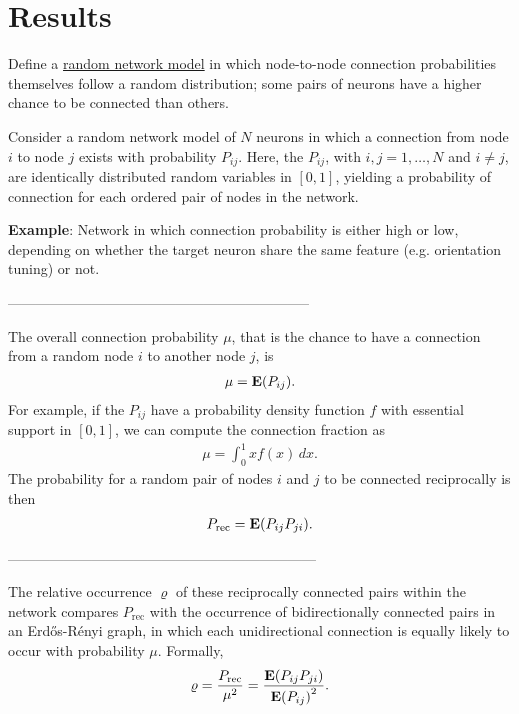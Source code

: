 
\section*{Results}

Define a \underline{random network model} in which node-to-node connection probabilities themselves follow a random distribution; some pairs of neurons have a higher chance to be connected than others.


Consider a random network model of $N$ neurons in which a connection from node $i$ to node $j$ exists with probability $P_{ij}$.
%
Here, the $P_{ij}$, with $i,j = 1,\dots,N$ and $i \neq j$, are identically distributed random variables in $[0,1]$, yielding a probability of connection for each ordered pair of nodes in the network.

\textbf{\textcolor{gblue}{Example}}: Network in which connection probability is either high or low, depending on whether the target neuron share the same feature (e.g. orientation tuning) or not.

\begin{center}
   -----------------------------------------------------------------
\end{center}

The overall connection probability $\mu$, that is the chance to have a connection from a random node $i$ to another node $j$, is
\begin{align}
\mu = \operatorname{\mathbf{E}}(P_{ij}).
\end{align}
For example, if the $P_{ij}$ have a probability density function $f$ with essential support in $[0,1]$, we can compute the connection fraction as
\begin{align}
  \mu = \int_0^1 x f(x)\,dx.
\end{align}
The probability for a random pair of nodes $i$ and $j$ to be connected reciprocally is then
\begin{align}
P_{\mathrm{rec}} = \operatorname{\mathbf{E}}(P_{ij} P_{ji}).
\end{align}

\begin{center}
  ------------------------------------------------------------------
\end{center}

The relative occurrence $\varrho$ of these reciprocally connected pairs within the network compares $P_{\mathrm{rec}}$ with the occurrence of bidirectionally connected pairs in an Erd\H{o}s-R\'{e}nyi graph, in which each unidirectional connection is equally likely to occur with probability $\mu$. Formally,
\begin{align}
  \varrho = \frac{P_{\mathrm{rec}}}{\mu^2} = \frac{\E\left(P_{ij}P_{ji}\right)}{{\E\left(P_{ij}\right)}^2}.
\end{align}

